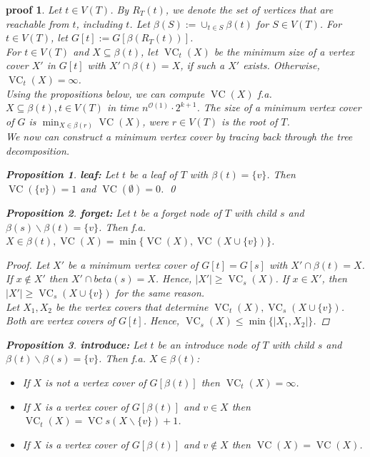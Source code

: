 \documentclass[11pt,a4paper]{article}
\newtheorem*{proposition}{Proposition}
\newtheorem*{proof_}{proof}
\DeclareMathOperator{\VC}{VC}
\begin{document}
\begin{proof_}
Let $t \in V(T)$. By $R_{T}(t)$, we denote the set of vertices that are reachable from $t$, including $t$. Let $\beta(S) := \cup_{t \in S} \beta(t)$ for $S \in V(T)$. For $t \in V(T)$, let $G[t] := G[\beta(R_{T}(t))]$. \\

For $t \in V(T)$ and $X \subseteq \beta(t)$, let $\VC_{t}(X)$ be the minimum size of a vertex cover $X'$ in $G[t]$ with $X' \cap \beta(t) = X$, if such a $X'$ exists. Otherwise, $\VC_{t}(X) = \infty$. \\

Using the propositions below, we can compute $\VC(X)$ f.a. $X \subseteq \beta(t), t \in V(T)$ in time $n^{\mathcal{O}(1)} \cdot 2^{k+1}$. The size of a minimum vertex cover of $G$ is $\min_{X \in \beta(r)} \VC(X)$, were $r \in V(T)$ is the root of $T$. \\
We now can construct a minimum vertex cover by tracing back through the tree decomposition.

\begin{proposition}
\textbf{leaf:} Let $t$ be a leaf of $T$ with $\beta(t) = \{v\}$. Then $\VC(\{v\}) = 1$ and $\VC(\emptyset) = 0$. \qed
\end{proposition}

\begin{proposition}
\textbf{forget:} Let $t$ be a forget node of $T$ with child $s$ and $\beta(s) \backslash \beta(t) = \{v\}$. Then f.a. $X \in \beta(t), \VC(X) = \min \{\VC(X), \VC(X \cup \{v\})\}$.
\end{proposition}

\begin{proof}
Let $X'$ be a minimum vertex cover of $G[t] = G[s]$ with $X' \cap \beta(t) = X$. If $x \not \in X'$ then $X' \cap beta(s) = X$. Hence, $|X'| \geq \VC_{s}(X)$. If $x \in X'$, then $|X'| \geq \VC_{s}(X \cup \{v\})$ for the same reason. \\
Let $X_{1}, X_{2}$ be the vertex covers that determine $\VC_{t}(X),  \VC_{s}(X \cup \{v\})$. Both are vertex covers of $G[t]$. Hence, $\VC_{s}(X) \leq \min \{|X_{1}, X_{2}| \}$.
\end{proof}


\begin{proposition}
\textbf{introduce:} Let $t$ be an introduce node of $T$ with child $s$ and $\beta(t) \backslash \beta(s) = \{v\}$. Then f.a. $X \in \beta(t)$:

\begin{itemize}
\item [(1)] If $X$ is not a vertex cover of $G[\beta(t)]$ then $\VC_{t}(X) = \infty$. 
\item [(2)] If $X$ is a vertex cover of $G[\beta(t)]$ and $v \in X$ then $\VC_{t}(X) = \VC{s}(X \backslash \{v\}) + 1$.
\item [(3)] If $X$ is a vertex cover of $G[\beta(t)]$ and $v \not \in X$ then $\VC(X) = \VC(X)$.
\end{itemize}
\end{proposition}


\end{proof_}
\end{document}
